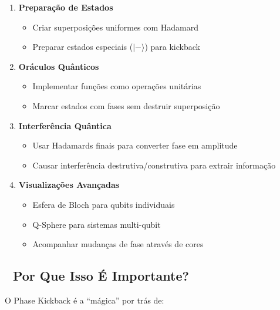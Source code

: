 \documentclass[
  brazilian,
]{report}
\providecommand{\tightlist}{%
  \setlength{\itemsep}{0pt}\setlength{\parskip}{0pt}}
\begin{document}
\begin{enumerate}
\def\labelenumi{\arabic{enumi}.}
\tightlist
\item
  \textbf{Preparação de Estados}

  \begin{itemize}
  \tightlist
  \item
    Criar superposições uniformes com Hadamard
  \item
    Preparar estados especiais (\(|-\rangle\)) para kickback
  \end{itemize}
\item
  \textbf{Oráculos Quânticos}

  \begin{itemize}
  \tightlist
  \item
    Implementar funções como operações unitárias
  \item
    Marcar estados com fases sem destruir superposição
  \end{itemize}
\item
  \textbf{Interferência Quântica}

  \begin{itemize}
  \tightlist
  \item
    Usar Hadamards finais para converter fase em amplitude
  \item
    Causar interferência destrutiva/construtiva para extrair informação
  \end{itemize}
\item
  \textbf{Visualizações Avançadas}

  \begin{itemize}
  \tightlist
  \item
    Esfera de Bloch para qubits individuais
  \item
    Q-Sphere para sistemas multi-qubit
  \item
    Acompanhar mudanças de fase através de cores
  \end{itemize}
\end{enumerate}

\subsection{🚀 Por Que Isso É
Importante?}\label{por-que-isso-uxe9-importante}

O Phase Kickback é a ``mágica'' por trás de:
\end{document}
